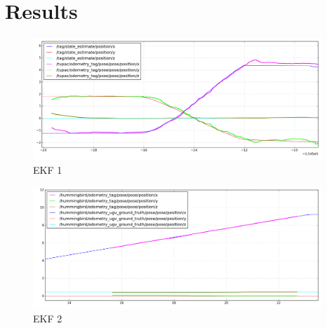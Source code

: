 \section{Results}
\begin{figure}[!ht]
    \centering
    \includegraphics[width=0.97\textwidth]{img/position_real_world_fast.png}
    \caption{EKF 1}
    \label{fig:ekf_position_fast}
\end{figure}
\begin{figure}[!ht]
    \centering
    \includegraphics[width=0.97\textwidth]{img/position_simulation_hot_init.png}
    \caption{EKF 2}
    \label{fig:ekf_position_hot_init}
\end{figure}
